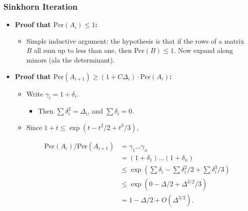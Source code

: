 \documentclass[usenames,dvipsnames,12pt]{beamer}
\begin{document}
\begin{frame}
    \frametitle{Sinkhorn Iteration}

    \begin{itemize}
        \item {\bf Proof that $\text{Per}(A_i) \leq 1$:}
        \begin{itemize}
            \pause
            \item Simple inductive argument: the hypothesis is that if the rows of a matrix $B$ all sum up to less than one, then $\text{Per}(B) \leq 1$. Now expand along minors (ala the determinant).
        \end{itemize}

        \pause
        \item {\bf Proof that $\text{Per}(A_{i+1}) \geq (1 + C \Delta_i) \cdot \text{Per}(A_i)$:}
        \begin{itemize}
            \pause
            \item Write $\gamma_i = 1 + \delta_i$.

            \begin{itemize}
                \pause
                \item Then $\sum \delta_i^2 = \Delta_i$, and $\sum \delta_i = 0$.
            \end{itemize}

            \pause
            \item Since $1 + t \leq \exp(t - t^2/2 + t^3/3)$,

            \vspace{-2em}
            \begin{align*}
                \text{Per}(A_i) / \text{Per}(A_{i+1}) &= \gamma_1 \dots \gamma_n \\
                &= (1 + \delta_1) \dots (1 + \delta_n)\\
                &\leq \exp \left(\sum \delta_i - \sum \delta_i^2/2 + \sum \delta_i^3/3 \right)\\
                &\leq \exp(0 - \Delta/2 + \Delta^{3/2}/3)\\
                &= 1 - \Delta / 2 + O(\Delta^{3/2}).
            \end{align*}
        \end{itemize}
    \end{itemize}
\end{frame}
\end{document}
